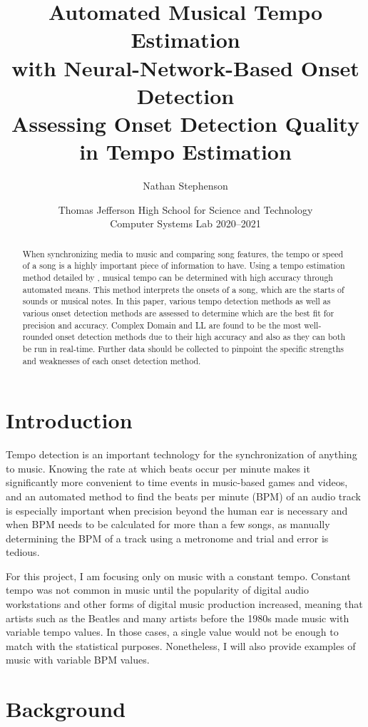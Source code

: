 \documentclass[11pt, oneside]{article}
\title{Automated Musical Tempo Estimation \\
       with Neural-Network-Based Onset Detection \\
       \vspace{0.75em}
       \large Assessing Onset Detection Quality in Tempo Estimation}
\author{Nathan Stephenson}
\date{Thomas Jefferson High School for Science and Technology \\
      Computer Systems Lab 2020--2021}
\begin{document}
\maketitle

\begin{abstract}
    When synchronizing media to music and comparing song features, the tempo or
    speed of a song is a highly important piece of information to have. Using a
    tempo estimation method detailed by \citeauthor*{bram}, musical tempo can be
    determined with high accuracy through automated means. This method
    interprets the onsets of a song, which are the starts of sounds or musical
    notes. In this paper, various tempo detection methods as well as various
    onset detection methods are assessed to determine which are the best fit for
    precision and accuracy. Complex Domain and LL are found to be the most
    well-rounded onset detection methods due to their high accuracy and also as
    they can both be run in real-time. Further data should be collected to
    pinpoint the specific strengths and weaknesses of each onset detection
    method.
\end{abstract}


\section{Introduction} \label{sec:intro}
Tempo detection is an important technology for the synchronization of anything
to music. Knowing the rate at which beats occur per minute makes it
significantly more convenient to time events in music-based games and videos,
and an automated method to find the beats per minute (BPM) of an audio track is
especially important when precision beyond the human ear is necessary and when
BPM needs to be calculated for more than a few songs, as manually determining
the BPM of a track using a metronome and trial and error is tedious.

For this project, I am focusing only on music with a constant tempo. Constant
tempo was not common in music until the popularity of digital audio workstations
and other forms of digital music production increased, meaning that artists such
as the Beatles and many artists before the 1980s made music with variable tempo
values. In those cases, a single value would not be enough to match with the
statistical purposes. Nonetheless, I will also provide examples of music with
variable BPM values.


\section{Background} \label{sec:background}
\end{document}
